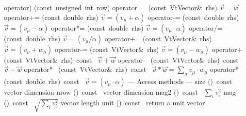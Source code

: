 \documentclass{article}
\begin{document}
\begin{cxxentry}
\begin{cxxclass}
\begin{cxxpublic}
        {}
        {}
\label{cxx.2.1.13}
        {operator)}
        {(const\ unsigned\ int\ row)}
        {}
        {}
\label{cxx.2.1.14}
        {operator=\ }
        {(const\ VtVector\&\ rhs)}
        { $\vec{v} = \vec{w}$}
        {}
\label{cxx.2.1.15}
        {operator+=}
        {(const\ double\ rhs)}
        { $\vec{v} = (v_\mu + \alpha)$}
        {}
\label{cxx.2.1.16}
        {operator-=}
        {(const\ double\ rhs)}
        { $\vec{v} = (v_\mu - \alpha)$}
        {}
\label{cxx.2.1.17}
        {operator*=}
        {(const\ double\ rhs)}
        { $\vec{v} = (v_\mu \cdot \alpha)$}
        {}
\label{cxx.2.1.18}
        {operator/=}
        {(const\ double\ rhs)}
        { $\vec{v} = (v_\mu / \alpha)$}
        {}
\label{cxx.2.1.19}
        {operator+=}
        {(const\ VtVector\&\ rhs)}
        { $\vec{v} = (v_\mu + w_\mu)$}
        {}
\label{cxx.2.1.20}
        {operator-=}
        {(const\ VtVector\&\ rhs)}
        { $\vec{v} = (v_\mu - w_\mu)$}
        {}
\label{cxx.2.1.21}
        {operator+\ }
        {(const\ VtVector\&\ rhs)\ const\ }
        { $\vec{v} + \vec{w}$}
        {}
\label{cxx.2.1.22}
        {operator-\ }
        {(const\ VtVector\&\ rhs)\ const\ }
        { $\vec{v} - \vec{w}$}
        {}
\label{cxx.2.1.23}
        {operator*\ }
        {(const\ VtVector\&\ rhs)\ const\ }
        { $\vec{v} * \vec{w} = \sum_\mu v_\mu \cdot w_\mu$}
        {}
\label{cxx.2.1.24}
        {operator*}
        {(const\ double\ rhs)\ const\ }
        { $\vec{v} = (v_\mu \cdot \alpha)$}
        {}
\label{cxx.2.1.25}
\cxxitem{}
        {--- Access methods --- }
        {}
        {}
        {}
\label{cxx.2.1.26}
        {size}
        {()\ const\ }
        { vector dimension}
        {}
\label{cxx.2.1.27}
        {nrow}
        {()\ const\ }
        { vector dimension}
        {}
\label{cxx.2.1.28}
        {mag2}
        {()\ const\ }
        { $\sum_i v_i^2$}
        {}
\label{cxx.2.1.29}
        {mag}
        {()\ const\ }
        { $\sqrt{\sum_i v_i^2}$ vector length}
        {}
\label{cxx.2.1.30}
        {unit}
        {()\ const\ }
        { return a unit vector}
        {}
\label{cxx.2.1.31}

\end{cxxpublic}
\end{cxxclass}
\end{cxxentry}
\end{document}
